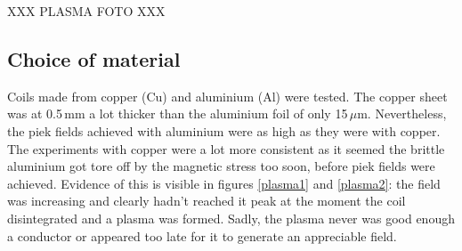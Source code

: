 XXX PLASMA FOTO XXX



\subsection{Choice of material}

Coils made from copper (Cu) and aluminium (Al) were tested. The copper sheet 
was at 0.5\,mm a lot thicker than the aluminium foil of only 15\,$\mu$m.  
Nevertheless, the piek fields achieved with aluminium were as high as they were 
with copper. The experiments with copper were a lot more consistent as it 
seemed the brittle aluminium got tore off by the magnetic stress too soon, 
before piek fields were achieved. Evidence of this is visible in figures 
\ref{plasma1} and \ref{plasma2}: the field was increasing and clearly hadn't 
reached it peak at the moment the coil disintegrated and a plasma was formed.  
Sadly, the plasma never was good enough a conductor or appeared too late for it 
to generate an appreciable field.
